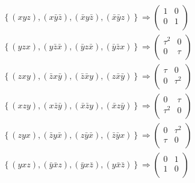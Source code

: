 \begin{gather*}
    \left\{
        (xyz),
        (x\bar{y}\bar{z}),
        (\bar{x}y\bar{z}),
        (\bar{x}\bar{y}z)
    \right\}
    \Rightarrow
    \begin{pmatrix}
        1 & 0 \\
        0 & 1 \\
    \end{pmatrix}
    \\
    \left\{
        (yzx),
        (y\bar{z}\bar{x}),
        (\bar{y}z\bar{x}),
        (\bar{y}\bar{z}x)
    \right\}
    \Rightarrow
    \begin{pmatrix}
        \tau^{2} & 0    \\
        0        & \tau \\
    \end{pmatrix}
    \\
    \left\{
        (zxy),
        (\bar{z}x\bar{y}),
        (\bar{z}\bar{x}y),
        (z\bar{x}\bar{y})
    \right\}
    \Rightarrow
    \begin{pmatrix}
        \tau & 0        \\
        0    & \tau^{2} \\
    \end{pmatrix}
    \\
    \left\{
        (xzy),
        (x\bar{z}\bar{y}),
        (\bar{x}\bar{z}y),
        (\bar{x}z\bar{y})
    \right\}
    \Rightarrow
    \begin{pmatrix}
        0        & \tau \\
        \tau^{2} & 0    \\
    \end{pmatrix}
    \\
    \left\{
        (zyx),
        (\bar{z}y\bar{x}),
        (z\bar{y}\bar{x}),
        (\bar{z}\bar{y}x)
    \right\}
    \Rightarrow
    \begin{pmatrix}
        0    & \tau^{2} \\
        \tau & 0        \\
    \end{pmatrix}
    \\
    \left\{
        (yxz),
        (\bar{y}\bar{x}z),
        (\bar{y}x\bar{z}),
        (y\bar{x}\bar{z})
    \right\}
    \Rightarrow
    \begin{pmatrix}
        0 & 1 \\
        1 & 0 \\
    \end{pmatrix}
\end{gather*}




